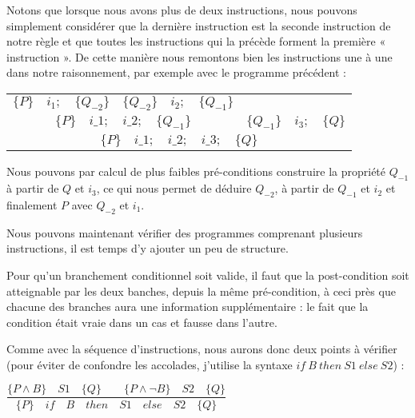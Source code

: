 \documentclass[middle]{zmdocument}
\begin{document}


Notons que lorsque nous avons plus de deux instructions, nous pouvons simplement
considérer que la dernière instruction est la seconde instruction de notre règle
et que toutes les instructions qui la précède forment la première « instruction ». 
De cette manière nous remontons bien les instructions une à une dans notre
raisonnement, par exemple avec le programme précédent :


\begin{center}
\begin{tabular}{ccc}
  $\{P\}\quad i_1 ; \quad \{Q_{-2}\}$ & $\{Q_{-2}\}\quad i_2 ; \quad \{Q_{-1}\}$ & \\
  \cline{1-2}
  \multicolumn{2}{c}{$\{P\}\quad i\_1 ; \quad i\_2 ; \quad \{Q_{-1}\}$} & $\{Q_{-1}\} \quad i_3 ; \quad \{Q\}$\\
  \hline
  \multicolumn{3}{c}{$\{P\}\quad i\_1 ; \quad i\_2 ; \quad i\_3; \quad \{ Q \}$}
\end{tabular}
\end{center}

Nous pouvons par calcul de plus faibles pré-conditions construire la propriété
$Q_{-1}$ à partir de $Q$ et $i_3$, ce qui nous permet de déduire $Q_{-2}$, à 
partir de $Q_{-1}$ et $i_2$ et finalement $P$ avec $Q_{-2}$ et $i_1$.



Nous pouvons maintenant vérifier des programmes comprenant plusieurs 
instructions, il est temps d'y ajouter un peu de structure.





Pour qu'un branchement conditionnel soit valide, il faut que la post-condition
soit atteignable par les deux banches, depuis la même pré-condition, à ceci 
près que chacune des branches aura une information supplémentaire : le fait 
que la condition était vraie dans un cas et fausse dans l'autre.



Comme avec la séquence d'instructions, nous aurons donc deux points à vérifier
(pour éviter de confondre les accolades, j'utilise la syntaxe 
$if\ B\ then\ S1\ else\ S2$) :




\begin{center}
$\dfrac{\{P \wedge B\}\quad S1\quad \{Q\} \quad \quad \{P \wedge \neg B\}\quad S2\quad \{Q\}}{\{P\}\quad if\quad B\quad then\quad S1\quad else\quad S2 \quad \{Q\}}$


\end{center}
\end{document}
